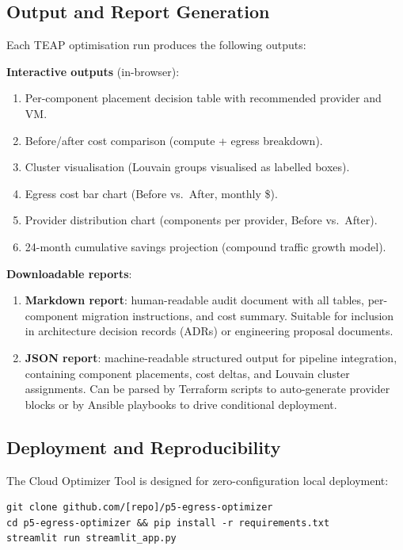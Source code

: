 \documentclass[10pt,journal]{IEEEtran}
\begin{document}
\subsection{Output and Report Generation}

Each TEAP optimisation run produces the following outputs:

\textbf{Interactive outputs} (in-browser):
\begin{enumerate}[leftmargin=*,noitemsep]
  \item Per-component placement decision table with recommended provider and VM.
  \item Before/after cost comparison (compute + egress breakdown).
  \item Cluster visualisation (Louvain groups visualised as labelled boxes).
  \item Egress cost bar chart (Before vs.\ After, monthly \$).
  \item Provider distribution chart (components per provider, Before vs.\ After).
  \item 24-month cumulative savings projection (compound traffic growth model).
\end{enumerate}

\textbf{Downloadable reports}:
\begin{enumerate}[leftmargin=*,noitemsep]
  \item \textbf{Markdown report}: human-readable audit document with all tables,
    per-component migration instructions, and cost summary.
    Suitable for inclusion in architecture decision records (ADRs) or
    engineering proposal documents.
  \item \textbf{JSON report}: machine-readable structured output for pipeline
    integration, containing component placements, cost deltas, and
    Louvain cluster assignments.
    Can be parsed by Terraform scripts to auto-generate provider blocks
    or by Ansible playbooks to drive conditional deployment.
\end{enumerate}

\subsection{Deployment and Reproducibility}

The Cloud Optimizer Tool is designed for zero-configuration local deployment:
{\small\begin{verbatim}
git clone github.com/[repo]/p5-egress-optimizer
cd p5-egress-optimizer && pip install -r requirements.txt
streamlit run streamlit_app.py
\end{verbatim}}
\end{document}
